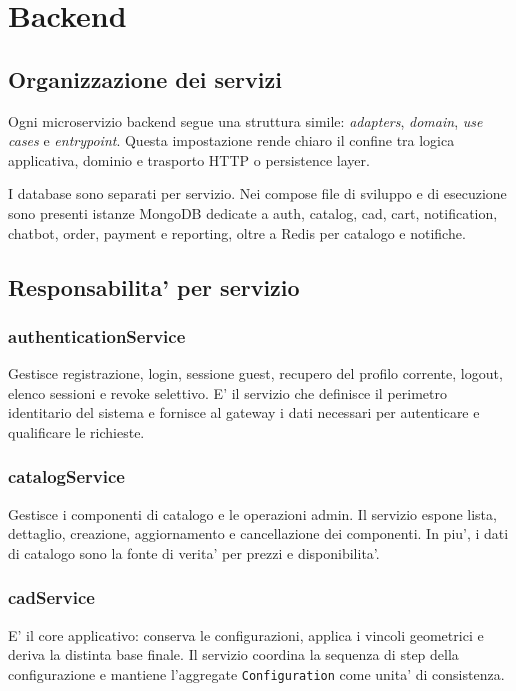 \chapter{Backend}

\section{Organizzazione dei servizi}

Ogni microservizio backend segue una struttura simile: \emph{adapters}, \emph{domain}, \emph{use cases} e \emph{entrypoint}. Questa impostazione rende chiaro il confine tra logica applicativa, dominio e trasporto HTTP o persistence layer.

I database sono separati per servizio. Nei compose file di sviluppo e di esecuzione sono presenti istanze MongoDB dedicate a auth, catalog, cad, cart, notification, chatbot, order, payment e reporting, oltre a Redis per catalogo e notifiche.

\section{Responsabilita' per servizio}

\subsection{authenticationService}
Gestisce registrazione, login, sessione guest, recupero del profilo corrente, logout, elenco sessioni e revoke selettivo. E' il servizio che definisce il perimetro identitario del sistema e fornisce al gateway i dati necessari per autenticare e qualificare le richieste.

\subsection{catalogService}
Gestisce i componenti di catalogo e le operazioni admin. Il servizio espone lista, dettaglio, creazione, aggiornamento e cancellazione dei componenti. In piu', i dati di catalogo sono la fonte di verita' per prezzi e disponibilita'.

\subsection{cadService}
E' il core applicativo: conserva le configurazioni, applica i vincoli geometrici e deriva la distinta base finale. Il servizio coordina la sequenza di step della configurazione e mantiene l'aggregate \texttt{Configuration} come unita' di consistenza.

